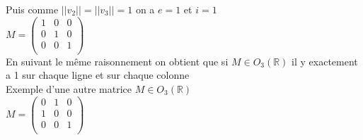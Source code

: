 \documentclass{article}
\begin{document}
Puis comme $||v_2|| = ||v_3|| = 1$ on a $e = 1$ et $i = 1$\\
$M = \begin{pmatrix}
    1 & 0 & 0\\
    0 & 1 & 0\\
    0 & 0 & 1\\
\end{pmatrix}$\\
En suivant le même raisonnement on obtient que si $M \in O_3(\mathbb{R})$ il y exactement a 1 sur chaque ligne et sur chaque colonne\\
Exemple d'une autre matrice $M \in O_3(\mathbb{R})$\\
$M = \begin{pmatrix}
    0 & 1 & 0\\
    1 & 0 & 0\\
    0 & 0 & 1\\
\end{pmatrix}$
\end{document}
